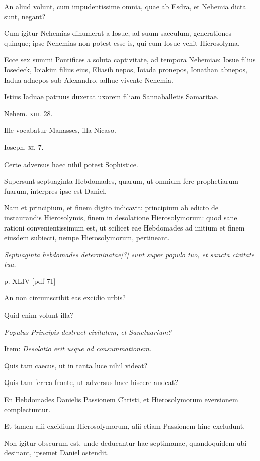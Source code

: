 \begin{parnumbers}
An aliud volunt, cum impudentissime omnia, quae ab Esdra,
et Nehemia dicta sunt, negant?

Cum igitur Nehemias dinumerat
a Iosue, ad suum saeculum, generationes quinque; ipse
Nehemias non potest esse is, qui cum Iosue venit Hierosolyma.

Ecce sex summi Pontifices a soluta captivitate, ad tempora Nehemiae:
Iosue filius Iosedeck, Ioiakim filius eius, Eliasib nepos,
Ioiada pronepos, Ionathan abnepos, Iadua adnepos sub Alexandro,
adhuc vivente Nehemia.

Istius Iaduae patruus duxerat uxorem
filiam Sannaballetis Samaritae.

Nehem. \textsc{xiii}. 28.

Ille vocabatur
Manasses, illa Nicaso.

Ioseph. \textsc{xi}, 7.

Certe adversus haec
nihil potest Sophistice.

Supersunt septuaginta Hebdomades, quarum,
ut omnium fere prophetiarum fuarum, interpres ipse est Daniel.

Nam et principium, et finem digito indicavit: principium ab
edicto de instaurandis Hierosolymis, finem in desolatione Hierosolymorum:
quod sane rationi convenientissimum est, ut scilicet eae
Hebdomades ad initium et finem eiusdem subiecti, nempe Hierosolymorum,
pertineant.

\textit{Septuaginta hebdomades determinatae[?] sunt
super populo tuo, et sancta civitate tua.}

\clearpage
p. XLIV [pdf 71]

An non circumscribit eas
excidio urbis?

Quid enim volunt illa?

\textit{Populus Principis destruet civitatem,
et Sanctuarium?}

Item: \textit{Desolatio erit usque ad consummationem.}

Quis tam caecus, ut in tanta luce nihil videat?

Quis tam ferrea fronte, ut adversus haec hiscere audeat?

En Hebdomades
Danielis Passionem Christi, et Hierosolymorum eversionem complectuntur.

Et tamen alii excidium Hierosolymorum, alii etiam
Passionem hinc excludunt.

Non igitur obscurum est, unde deducantur
hae septimanae, quandoquidem ubi desinant, ipsemet Daniel
ostendit.


\end{parnumbers}
